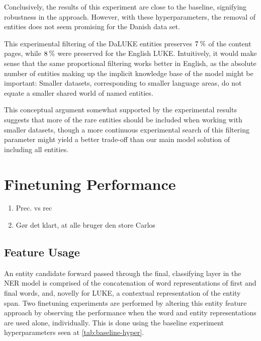 \documentclass[main.tex]{subfiles}
\begin{document}


Conclusively, the results of this experiment are close to the baseline, signifying robustness in the approach.
However, with these hyperparameters, the removal of entities does not seem promising for the Danish data set.

This experimental filtering of the DaLUKE entities preserves $7\:\text{\%{}}$ of the content pages, while $8\:\text{\%{}}$ were preserved for the English LUKE.
Intuitively, it would make sense that the same proportional filtering works better in English, as the absolute number of entities making up the implicit knowledge base of the model might be important:
Smaller datasets, corresponding to smaller language areas, do not equate a smaller shared world of named entities.

This conceptual argument somewhat supported by the experimental results suggests that more of the rare entities should be included when working with smaller datasets, though a more continuous experimental search of this filtering parameter might yield a better trade-off than our main model solution of including all entities.

\section{Finetuning Performance}
\label{sec:finetuning-exp}
\begin{enumerate}
    \item Prec. vs rec
    \item Gør det klart, at alle bruger den store Carlos
\end{enumerate}

\subsection{Feature Usage}%
\label{sub:Feature Usage}
An entity candidate forward passed through the final, classifying layer in the NER model is comprised of the concatenation of word representations of first and final words, and, novelly for LUKE, a contextual representation of the entity span.
Two finetuning experiments are performed by altering this entity feature approach by observing the performance when the word and entity representations are used alone, individually.
This is done using the baseline experiment hyperparameters seen at \ref{tab:baseline-hyper}.
\end{document}
